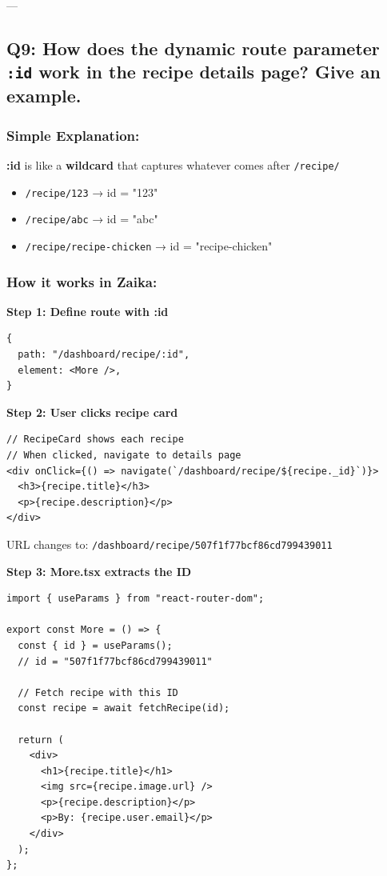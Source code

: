 \documentclass[12pt]{article}
\begin{document}
---

\subsection{Q9: How does the dynamic route parameter \texttt{:id} work in the recipe details page? Give an example.}

\subsubsection*{Simple Explanation:}

\textbf{:id} is like a \textbf{wildcard} that captures whatever comes after \texttt{/recipe/}

\begin{itemize}
    \item \texttt{/recipe/123} → id = "123"
    \item \texttt{/recipe/abc} → id = "abc"
    \item \texttt{/recipe/recipe-chicken} → id = "recipe-chicken"
\end{itemize}

\subsubsection*{How it works in Zaika:}

\textbf{Step 1: Define route with :id}

\begin{lstlisting}
{
  path: "/dashboard/recipe/:id",
  element: <More />,
}
\end{lstlisting}

\textbf{Step 2: User clicks recipe card}

\begin{lstlisting}
// RecipeCard shows each recipe
// When clicked, navigate to details page
<div onClick={() => navigate(`/dashboard/recipe/${recipe._id}`)}>
  <h3>{recipe.title}</h3>
  <p>{recipe.description}</p>
</div>
\end{lstlisting}

URL changes to: \texttt{/dashboard/recipe/507f1f77bcf86cd799439011}

\textbf{Step 3: More.tsx extracts the ID}

\begin{lstlisting}
import { useParams } from "react-router-dom";

export const More = () => {
  const { id } = useParams();
  // id = "507f1f77bcf86cd799439011"
  
  // Fetch recipe with this ID
  const recipe = await fetchRecipe(id);
  
  return (
    <div>
      <h1>{recipe.title}</h1>
      <img src={recipe.image.url} />
      <p>{recipe.description}</p>
      <p>By: {recipe.user.email}</p>
    </div>
  );
};
\end{lstlisting}
\end{document}
